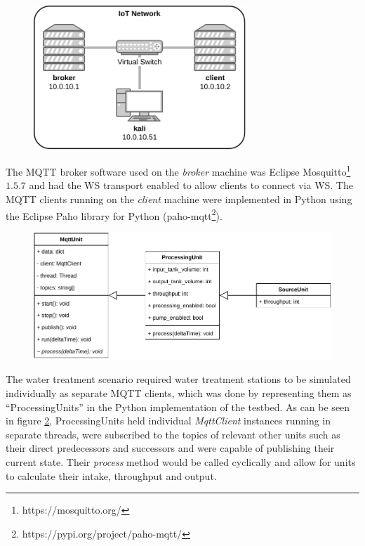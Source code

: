 \begin{figure}[h]
    \centering
    \includegraphics[width=8cm]{img/ch04/Testbed2.pdf}
    \label{fig:testbed-network}
\end{figure}
The \ac{MQTT} broker software used on the \emph{broker} machine was Eclipse Mosquitto\footnote{https://mosquitto.org/} $1.5.7$ and had the \ac{WS} transport enabled to allow clients to connect via \ac{WS}. The \ac{MQTT} clients running on the \emph{client} machine were implemented in Python using the Eclipse Paho library for Python (paho-mqtt\footnote{https://pypi.org/project/paho-mqtt/}).\par
\begin{figure}[h]
    \centering
    \includegraphics[width=14cm]{img/ch04/Testbed-Unit.pdf}
    \label{fig:testbed-unit}
\end{figure}
The water treatment scenario required water treatment stations to be simulated individually as separate \ac{MQTT} clients, which was done by representing them as \enquote{ProcessingUnits} in the Python implementation of the testbed. As can be seen in figure \ref{fig:testbed-unit}, ProcessingUnits held individual \emph{MqttClient} instances running in separate threads, were subscribed to the topics of relevant other units such as their direct predecessors and successors and were capable of publishing their current state. Their \emph{process} method would be called cyclically and allow for units to calculate their intake, throughput and output.

